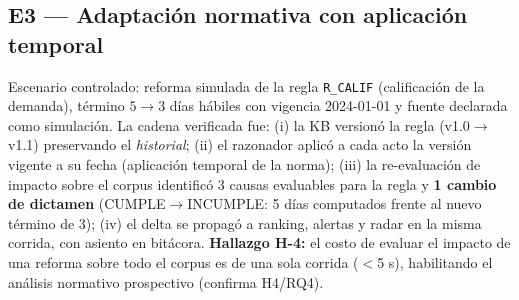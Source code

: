 \documentclass[a4paper,openany,12pt]{book}
\begin{document}
\subsection{E3 --- Adaptación normativa con aplicación temporal}
Escenario controlado: reforma simulada de la regla \texttt{R\_CALIF} (calificación de la demanda), término $5\to3$ días hábiles con vigencia 2024-01-01 y fuente declarada como simulación. La cadena verificada fue: (i) la KB versionó la regla (v1.0$\to$v1.1) preservando el \textit{historial}; (ii) el razonador aplicó a cada acto la versión vigente a su fecha (aplicación temporal de la norma); (iii) la re-evaluación de impacto sobre el corpus identificó 3 causas evaluables para la regla y \textbf{1 cambio de dictamen} (CUMPLE$\to$INCUMPLE: 5 días computados frente al nuevo término de 3); (iv) el delta se propagó a ranking, alertas y radar en la misma corrida, con asiento en bitácora. \textbf{Hallazgo H-4:} el costo de evaluar el impacto de una reforma sobre todo el corpus es de una sola corrida ($<$5 s), habilitando el análisis normativo prospectivo (confirma H4/RQ4).
\end{document}
